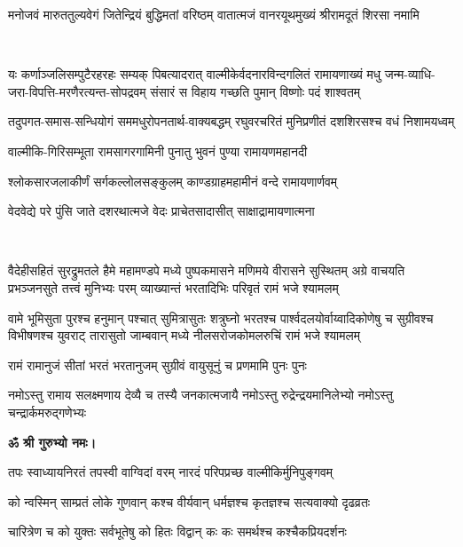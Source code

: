 \twolineshloka
{मनोजवं मारुततुल्यवेगं जितेन्द्रियं बुद्धिमतां वरिष्ठम्}
{वातात्मजं वानरयूथमुख्यं श्रीरामदूतं शिरसा नमामि}

\mbox{}\\
\resetShloka
{}

\fourlineindentedshloka
{यः कर्णाञ्जलिसम्पुटैरहरहः सम्यक् पिबत्यादरात्}
{वाल्मीकेर्वदनारविन्दगलितं रामायणाख्यं मधु}
{जन्म-व्याधि-जरा-विपत्ति-मरणैरत्यन्त-सोपद्रवम्}
{संसारं स विहाय गच्छति पुमान् विष्णोः पदं शाश्वतम्}

\twolineshloka
{तदुपगत-समास-सन्धियोगं सममधुरोपनतार्थ-वाक्यबद्धम्}
{रघुवरचरितं मुनिप्रणीतं दशशिरसश्च वधं निशामयध्वम्}

\twolineshloka
{वाल्मीकि-गिरिसम्भूता रामसागरगामिनी}
{पुनातु भुवनं पुण्या रामायणमहानदी}

\twolineshloka
{श्लोकसारजलाकीर्णं सर्गकल्लोलसङ्कुलम्}
{काण्डग्राहमहामीनं वन्दे रामायणार्णवम्}

\twolineshloka
{वेदवेद्ये परे पुंसि जाते दशरथात्मजे}
{वेदः प्राचेतसादासीत् साक्षाद्रामायणात्मना}

\mbox{}\\
\resetShloka
{}

\fourlineindentedshloka
{वैदेहीसहितं सुरद्रुमतले हैमे महामण्डपे}
{मध्ये पुष्पकमासने मणिमये वीरासने सुस्थितम्}
{अग्रे वाचयति प्रभञ्जनसुते तत्त्वं मुनिभ्यः परम्}
{व्याख्यान्तं भरतादिभिः परिवृतं रामं भजे श्यामलम्}

\fourlineindentedshloka
{वामे भूमिसुता पुरश्च हनुमान् पश्चात् सुमित्रासुतः}
{शत्रुघ्नो भरतश्च पार्श्वदलयोर्वाय्वादिकोणेषु च}
{सुग्रीवश्च विभीषणश्च युवराट् तारासुतो जाम्बवान्}
{मध्ये नीलसरोजकोमलरुचिं रामं भजे श्यामलम्}

\twolineshloka
{रामं रामानुजं सीतां भरतं भरतानुजम्}
{सुग्रीवं वायुसूनुं च प्रणमामि पुनः पुनः}

\twolineshloka
{नमोऽस्तु रामाय सलक्ष्मणाय देव्यै च तस्यै जनकात्मजायै}
{नमोऽस्तु रुद्रेन्द्रयमानिलेभ्यो नमोऽस्तु चन्द्रार्कमरुद्गणेभ्यः}

\centerline{\textbf{ॐ श्री गुरुभ्यो नमः।}}


\clearpage
\resetShloka
{}

\twolineshloka
{तपः स्वाध्यायनिरतं तपस्वी वाग्विदां वरम्}
{नारदं परिपप्रच्छ वाल्मीकिर्मुनिपुङ्गवम्}%

\twolineshloka
{को न्वस्मिन् साम्प्रतं लोके गुणवान् कश्च वीर्यवान्}
{धर्मज्ञश्च कृतज्ञश्च सत्यवाक्यो दृढव्रतः}%

\twolineshloka
{चारित्रेण च को युक्तः सर्वभूतेषु को हितः}
{विद्वान् कः कः समर्थश्च कश्चैकप्रियदर्शनः}%

